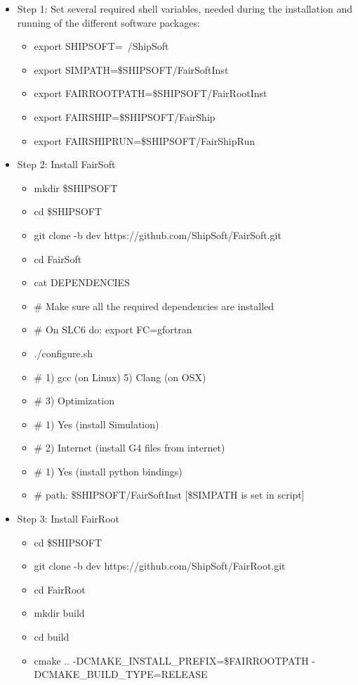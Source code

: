 \documentclass[12pt,a4paper]{article}
\begin{document}
\begin{itemize}
 \item Step 1: Set several required shell variables, needed during the installation and running of the different software packages:
 \begin{itemize}
  \item export SHIPSOFT=~/ShipSoft
  \item export SIMPATH=\$SHIPSOFT/FairSoftInst
  \item export FAIRROOTPATH=\$SHIPSOFT/FairRootInst
  \item export FAIRSHIP=\$SHIPSOFT/FairShip
  \item export FAIRSHIPRUN=\$SHIPSOFT/FairShipRun
 \end{itemize}
 \item Step 2: Install FairSoft
 \begin{itemize}
 \item mkdir \$SHIPSOFT 
 \item cd \$SHIPSOFT 
 \item git clone -b dev https://github.com/ShipSoft/FairSoft.git
 \item cd FairSoft
 \item cat DEPENDENCIES
 \item \# Make sure all the required dependencies are installed
 \item \# On SLC6 do: export FC=gfortran
 \item ./configure.sh
 \item \# 1) gcc (on Linux) 5) Clang (on OSX)
 \item \# 3) Optimization
 \item \# 1) Yes (install Simulation)
 \item \# 2) Internet (install G4 files from internet)
 \item \# 1) Yes (install python bindings)
 \item \# path: \$SHIPSOFT/FairSoftInst [\$SIMPATH is set in script]
 \end{itemize}
 \item Step 3: Install FairRoot
 \begin{itemize}
 \item cd \$SHIPSOFT
 \item git clone -b dev https://github.com/ShipSoft/FairRoot.git
 \item cd FairRoot
 \item mkdir build
 \item cd build
 \item cmake .. -DCMAKE\_INSTALL\_PREFIX=\$FAIRROOTPATH -DCMAKE\_BUILD\_TYPE=RELEASE

\end{itemize}
\end{itemize}
\end{document}
